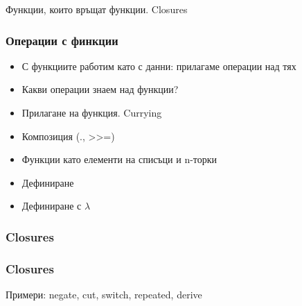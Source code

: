 \documentclass{beamer}
\begin{document}
\begin{frame}
  \centerline{Функции, които връщат функции. Closures}
\end{frame}

\begin{frame}[fragile]
  \frametitle{Операции с финкции}

\begin{itemize}
  \item С функциите работим като с данни: прилагаме операции над тях
  \item Какви операции знаем над функции?
\end{itemize}

\bigskip

\begin{itemize}
  \item Прилагане на функция. Currying
  \item Композиция (., >>=)
  \item Функции като елементи на списъци и n-торки
  \item Дефиниране
  \item Дефиниране с $\lambda$
\end{itemize}

\end{frame}


\begin{frame}[fragile]
  \frametitle{Closures}
\end{frame}


\begin{frame}[fragile]
  \frametitle{Closures}

Примери: negate, cut, switch, repeated, derive

\end{frame}


\end{document}
